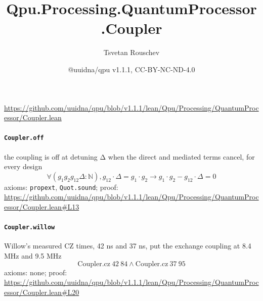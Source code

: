 \documentclass[11pt]{article}
\title{Qpu.Processing.QuantumProcessor.Coupler}
\author{Tsvetan Rouschev}
\date{@uuidna/qpu v1.1.1, CC-BY-NC-ND-4.0}
\begin{document}
\maketitle
\noindent\url{https://github.com/uuidna/qpu/blob/v1.1.1/lean/Qpu/Processing/QuantumProcessor/Coupler.lean}

\paragraph{\texttt{Coupler.off}}
the coupling is off at detuning Δ when the direct and mediated terms cancel, for every design
\[ \forall (g_{1} g_{2} g_{12} \Delta : \mathbb{N}), g_{12} \cdot \Delta = g_{1} \cdot g_{2} \to g_{1} \cdot g_{2} - g_{12} \cdot \Delta = 0 \]
\noindent axioms: \texttt{propext}, \texttt{Quot.sound}; proof: \url{https://github.com/uuidna/qpu/blob/v1.1.1/lean/Qpu/Processing/QuantumProcessor/Coupler.lean\#L13}

\paragraph{\texttt{Coupler.willow}}
Willow's measured CZ times, 42 ns and 37 ns, put the exchange coupling at 8.4 MHz and 9.5 MHz
\[ \mathrm{Coupler.cz}\ 42\ 84 \land \mathrm{Coupler.cz}\ 37\ 95 \]
\noindent axioms: none; proof: \url{https://github.com/uuidna/qpu/blob/v1.1.1/lean/Qpu/Processing/QuantumProcessor/Coupler.lean\#L20}
\end{document}
